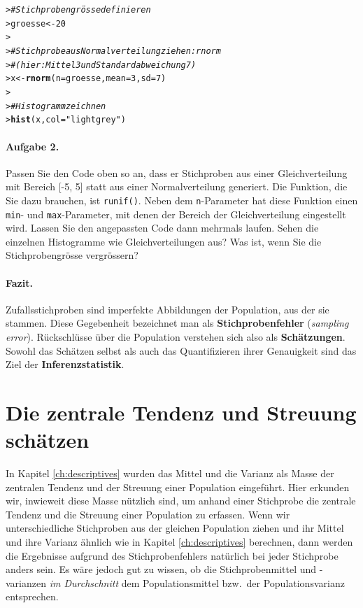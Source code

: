 \documentclass[oneside, 10pt]{book}\usepackage[]{graphicx}\usepackage[]{xcolor}
\makeatletter
\newcommand{\hlnum}[1]{\textcolor[rgb]{0.686,0.059,0.569}{#1}}%
\newcommand{\hlstr}[1]{\textcolor[rgb]{0.192,0.494,0.8}{#1}}%
\newcommand{\hlcom}[1]{\textcolor[rgb]{0.678,0.584,0.686}{\textit{#1}}}%
\newcommand{\hlstd}[1]{\textcolor[rgb]{0.345,0.345,0.345}{#1}}%
\newcommand{\hlkwb}[1]{\textcolor[rgb]{0.69,0.353,0.396}{#1}}%
\newcommand{\hlkwc}[1]{\textcolor[rgb]{0.333,0.667,0.333}{#1}}%
\newcommand{\hlkwd}[1]{\textcolor[rgb]{0.737,0.353,0.396}{\textbf{#1}}}%
\newenvironment{kframe}{%
 \def\at@end@of@kframe{}%
 \ifinner\ifhmode%
  \def\at@end@of@kframe{\end{minipage}}%
  \begin{minipage}{\columnwidth}%
 \fi\fi%
 \def\FrameCommand##1{\hskip\@totalleftmargin \hskip-\fboxsep
 \colorbox{shadecolor}{##1}\hskip-\fboxsep
     \hskip-\linewidth \hskip-\@totalleftmargin \hskip\columnwidth}%
 \MakeFramed {\advance\hsize-\width
   \@totalleftmargin\z@ \linewidth\hsize
   \@setminipage}}%
 {\par\unskip\endMakeFramed%
 \at@end@of@kframe}
\newenvironment{knitrout}{}{} %
\makeatother
\begin{document}
\begin{knitrout}
\color{fgcolor}\begin{kframe}
\begin{alltt}
\hlstd{> }\hlcom{# Stichprobengrösse definieren}
\hlstd{> }\hlstd{groesse} \hlkwb{<-} \hlnum{20}
\hlstd{> }
\hlstd{> }\hlcom{# Stichprobe aus Normalverteilung ziehen: rnorm}
\hlstd{> }\hlcom{# (hier: Mittel 3 und Standardabweichung 7)}
\hlstd{> }\hlstd{x} \hlkwb{<-} \hlkwd{rnorm}\hlstd{(}\hlkwc{n} \hlstd{= groesse,} \hlkwc{mean} \hlstd{=} \hlnum{3}\hlstd{,} \hlkwc{sd} \hlstd{=} \hlnum{7}\hlstd{)}
\hlstd{> }
\hlstd{> }\hlcom{# Histogramm zeichnen}
\hlstd{> }\hlkwd{hist}\hlstd{(x,} \hlkwc{col} \hlstd{=} \hlstr{"lightgrey"}\hlstd{)}
\end{alltt}
\end{kframe}
\end{knitrout}

\paragraph{Aufgabe 2.}
Passen Sie den Code oben so an, dass
er Stichproben aus einer Gleichverteilung mit
Bereich [-5, 5] statt aus einer Normalverteilung
generiert. Die Funktion, die Sie dazu brauchen,
ist \texttt{runif()}. Neben dem \texttt{n}-Parameter
hat diese Funktion einen \texttt{min}- und
\texttt{max}-Parameter, mit denen der Bereich
der Gleichverteilung eingestellt wird.
Lassen Sie den angepassten Code dann mehrmals
laufen. Sehen die einzelnen Histogramme
wie Gleichverteilungen aus? Was ist, wenn Sie
die Stichprobengrösse vergrössern?

\paragraph{Fazit.}
Zufallsstichproben sind imperfekte
Abbildungen der Population, aus der sie stammen.
Diese Gegebenheit bezeichnet man als
\textbf{Stichprobenfehler} (\textit{sampling error}).
Rückschlüsse über die Population verstehen sich
also als \textbf{Schätzungen}. Sowohl das Schätzen
selbst als auch das Quantifizieren ihrer Genauigkeit
sind das Ziel der \textbf{Inferenzstatistik}.

\section{Die zentrale Tendenz und Streuung schätzen}
In Kapitel \ref{ch:descriptives} wurden
das Mittel und die Varianz als Masse
der zentralen Tendenz und der Streuung
einer Population eingeführt. Hier
erkunden wir, inwieweit diese Masse nützlich
sind, um anhand einer Stichprobe die
zentrale Tendenz und die Streuung einer Population
zu erfassen. Wenn wir unterschiedliche Stichproben
aus der gleichen Population ziehen und
ihr Mittel und ihre Varianz ähnlich wie in
Kapitel \ref{ch:descriptives} berechnen,
dann werden die Ergebnisse aufgrund des
Stichprobenfehlers natürlich bei jeder Stichprobe
anders sein. Es wäre jedoch gut zu wissen,
ob die Stichprobenmittel und -varianzen
\emph{im Durchschnitt} dem Populationsmittel bzw.\
der Populationsvarianz entsprechen.
\end{document}
